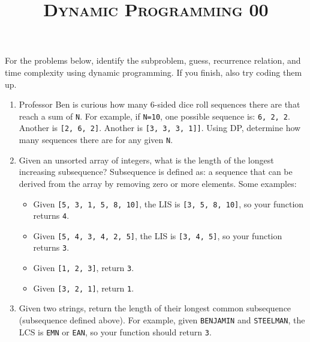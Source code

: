 \documentclass{article}
\title{\large{\textsc{Dynamic Programming 00}}}
\date{}
\begin{document}
\maketitle

\subsection*{}


For the problems below, identify the subproblem, guess, recurrence relation, and time complexity using dynamic programming. If you finish, also try coding them up.

\begin{enumerate}

\item Professor Ben is curious how many 6-sided dice roll sequences there are that reach a sum of \texttt{N}. For example, if \texttt{N=10}, one possible sequence is: \texttt{6, 2, 2}. Another is \texttt{[2, 6, 2]}. Another is \texttt{[3, 3, 3, 1]]}. Using DP, determine how many sequences there are for any given \texttt{N}.

\item Given an unsorted array of integers, what is the length of the longest increasing subsequence? Subsequence is defined as: a sequence that can be derived from the array by removing zero or more elements. Some examples:

\begin{itemize}
    \item Given \texttt{[5, 3, 1, 5, 8, 10]}, the LIS is \texttt{[3, 5, 8, 10]}, so your function returns \texttt{4}.
    \item Given \texttt{[5, 4, 3, 4, 2, 5]}, the LIS is \texttt{[3, 4, 5]}, so your function returns \texttt{3}.
    \item Given \texttt{[1, 2, 3]}, return \texttt{3}.
    \item Given \texttt{[3, 2, 1]}, return \texttt{1}.
\end{itemize}

\item Given two strings, return the length of their longest common subsequence (subsequence defined above). For example, given \texttt{BENJAMIN} and \texttt{STEELMAN}, the LCS is \texttt{EMN} or \texttt{EAN}, so your function should return \texttt{3}.

\end{enumerate}
\end{document}
